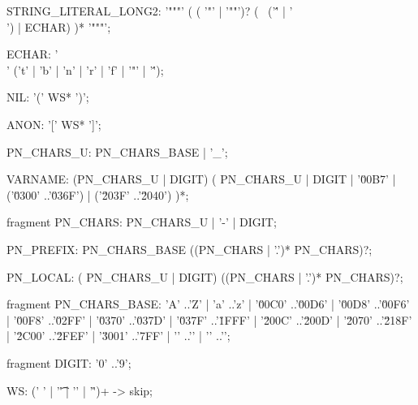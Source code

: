 \begin{code}
STRING_LITERAL_LONG2:
	'"""' (
		( '"' | '""')? ( ~('\'' | '\\') | ECHAR)
	)* '"""';

ECHAR: '\\' ('t' | 'b' | 'n' | 'r' | 'f' | '"' | '\'');

NIL: '(' WS* ')';

ANON: '[' WS* ']';

PN_CHARS_U: PN_CHARS_BASE | '_';

VARNAME: (PN_CHARS_U | DIGIT) (
		PN_CHARS_U
		| DIGIT
		| '\u00B7'
		| ('\u0300' ..'\u036F')
		| ('\u203F' ..'\u2040')
	)*;

fragment PN_CHARS:
	PN_CHARS_U
	| '-'
	| DIGIT;

PN_PREFIX: PN_CHARS_BASE ((PN_CHARS | '.')* PN_CHARS)?;

PN_LOCAL: ( PN_CHARS_U | DIGIT) ((PN_CHARS | '.')* PN_CHARS)?;

fragment PN_CHARS_BASE:
	'A' ..'Z'
	| 'a' ..'z'
	| '\u00C0' ..'\u00D6'
	| '\u00D8' ..'\u00F6'
	| '\u00F8' ..'\u02FF'
	| '\u0370' ..'\u037D'
	| '\u037F' ..'\u1FFF'
	| '\u200C' ..'\u200D'
	| '\u2070' ..'\u218F'
	| '\u2C00' ..'\u2FEF'
	| '\u3001' ..'\uD7FF'
	| '' ..'\uFDCF'
	| '' ..'\uFFFD';

fragment DIGIT: '0' ..'9';

WS: (' ' | '\t' | '\n' | '\r')+ -> skip;
\end{code}
